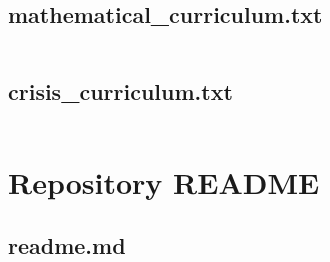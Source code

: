 \documentclass{article}
\begin{document}
\subsection{mathematical\_curriculum.txt}
\inputminted{text}{mathematical_curriculum.txt}
\subsection{crisis\_curriculum.txt}
\inputminted{text}{crisis_curriculum.txt}

\section{Repository README}
\subsection{readme.md}
\inputminted{markdown}{readme.md}

\end{document}
